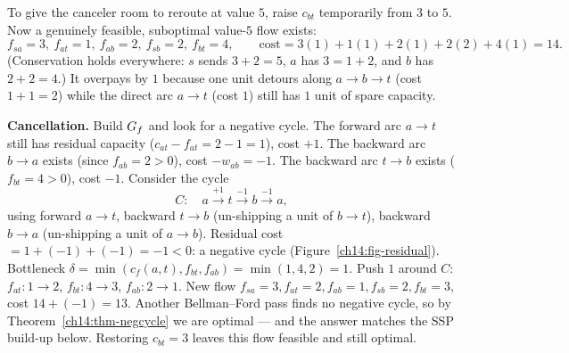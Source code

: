 To give the canceler room to reroute at value $5$, raise $c_{bt}$ temporarily from $3$ to $5$. Now a genuinely feasible, suboptimal value-$5$ flow exists:
\[
  f_{sa}=3,\ f_{at}=1,\ f_{ab}=2,\ f_{sb}=2,\ f_{bt}=4,\qquad
  \mathrm{cost}=3(1)+1(1)+2(1)+2(2)+4(1)=14 .
\]
(Conservation holds everywhere: $s$ sends $3+2=5$, $a$ has $3=1+2$, and $b$ has $2+2=4$.) It overpays by $1$ because one unit detours along $a\!\to\!b\!\to\!t$ (cost $1+1=2$) while the direct arc $a\!\to\!t$ (cost $1$) still has $1$ unit of spare capacity.

\textbf{Cancellation.} Build $G_f$ and look for a negative cycle. The forward arc $a\!\to\!t$ still has residual capacity ($c_{at}-f_{at}=2-1=1$), cost $+1$. The backward arc $b\!\to\!a$ exists (since $f_{ab}=2>0$), cost $-w_{ab}=-1$. The backward arc $t\!\to\!b$ exists ($f_{bt}=4>0$), cost $-1$. Consider the cycle
\[
  C:\quad a \xrightarrow{+1} t \xrightarrow{-1} b \xrightarrow{-1} a ,
\]
using forward $a\!\to\!t$, backward $t\!\to\!b$ (un-shipping a unit of $b\!\to\!t$), backward $b\!\to\!a$ (un-shipping a unit of $a\!\to\!b$). Residual cost $=1+(-1)+(-1)=-1<0$: a negative cycle (Figure~\ref{ch14:fig-residual}). Bottleneck $\delta=\min(c_f(a,t),f_{bt},f_{ab})=\min(1,4,2)=1$. Push $1$ around $C$: $f_{at}\!:\!1\to2$, $f_{bt}\!:\!4\to3$, $f_{ab}\!:\!2\to1$. New flow $f_{sa}=3,f_{at}=2,f_{ab}=1,f_{sb}=2,f_{bt}=3$, cost $14+(-1)=13$. Another Bellman--Ford pass finds no negative cycle, so by Theorem~\ref{ch14:thm-negcycle} we are optimal --- and the answer matches the SSP build-up below. Restoring $c_{bt}=3$ leaves this flow feasible and still optimal.

